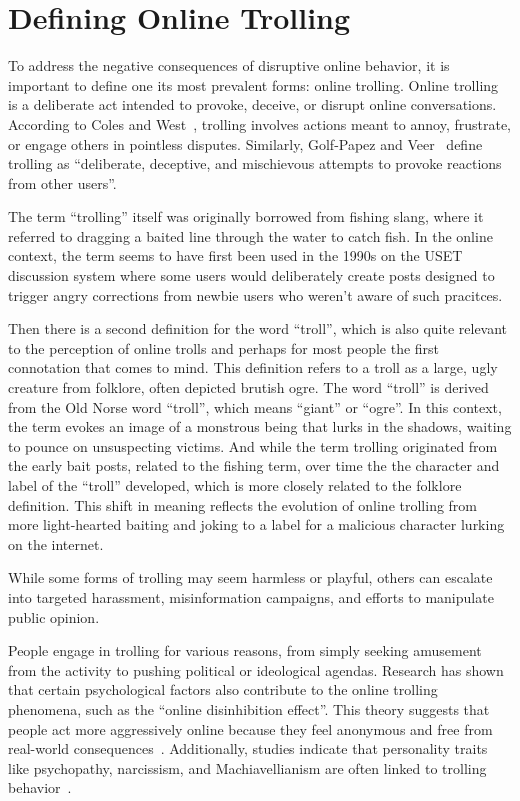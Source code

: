 \documentclass[twoside]{ctuthesis}
\theoremstyle{plain}
\theoremstyle{definition}
\theoremstyle{note}
\begin{document}
\section{Defining Online Trolling}
To address the negative consequences of disruptive online behavior, it is important to define one its most prevalent forms: online trolling. Online trolling is a deliberate act intended to provoke, deceive, or disrupt online conversations. According to Coles and West~\cite{Coles2016}, trolling involves actions meant to annoy, frustrate, or engage others in pointless disputes. Similarly, Golf-Papez and Veer~\cite{GolfPapez2017DontFeedTheTroll} define trolling as ``deliberate, deceptive, and mischievous attempts to provoke reactions from other users''.\par

The term ``trolling'' itself was originally borrowed from fishing slang, where it referred to dragging a baited line through the water to catch fish. In the online context, the term seems to have first been used  in the 1990s on the USET discussion system where some users would deliberately create posts designed to trigger angry corrections from newbie users who weren't aware of such pracitces.\par

Then there is a second definition for the word ``troll'', which is also quite relevant to the perception of online trolls and perhaps for most people the first connotation that comes to mind. This definition refers to a troll as a large, ugly creature from folklore, often depicted brutish ogre. The word ``troll'' is derived from the Old Norse word ``troll'', which means ``giant'' or ``ogre''. In this context, the term evokes an image of a monstrous being that lurks in the shadows, waiting to pounce on unsuspecting victims. And while the term trolling originated from the early bait posts, related to the fishing term, over time the the character and label of the ``troll'' developed, which is more closely related to the folklore definition. This shift in meaning reflects the evolution of online trolling from more light-hearted baiting and joking to a label for a malicious character lurking on the internet.\cite{Demsar2021}\par

While some forms of trolling may seem harmless or playful, others can escalate into targeted harassment, misinformation campaigns, and efforts to manipulate public opinion.\par
People engage in trolling for various reasons, from simply seeking amusement from the activity to pushing political or ideological agendas. Research has shown that certain psychological factors also contribute to the online trolling phenomena, such as the ``online disinhibition effect''. This theory suggests that people act more aggressively online because they feel anonymous and free from real-world consequences~\cite{Suler2004}. Additionally, studies indicate that personality traits like psychopathy, narcissism, and Machiavellianism are often linked to trolling behavior~\cite{Buckels2014TrollsWantToHaveFun}.\par
\end{document}
